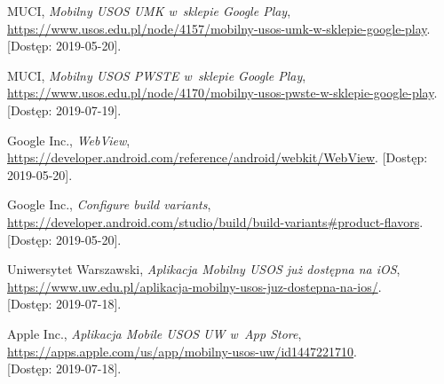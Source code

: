 \documentclass{pracamgr}
\begin{document}
\begin{thebibliography}{99}
 MUCI, \textit{Mobilny USOS UMK w~sklepie Google Play}, \url{https://www.usos.edu.pl/node/4157/mobilny-usos-umk-w-sklepie-google-play}. [Dostęp: 2019-05-20].

 MUCI, \textit{Mobilny USOS PWSTE w~sklepie Google Play}, \url{https://www.usos.edu.pl/node/4170/mobilny-usos-pwste-w-sklepie-google-play}. [Dostęp: 2019-07-19].

 Google Inc., \textit{WebView}, \url{https://developer.android.com/reference/android/webkit/WebView}. [Dostęp: 2019-05-20].

 Google Inc., \textit{Configure build variants}, \url{https://developer.android.com/studio/build/build-variants#product-flavors}. [Dostęp: 2019-05-20].

 Uniwersytet Warszawski,
\textit{Aplikacja Mobilny USOS już dostępna na iOS},\\
\url{https://www.uw.edu.pl/aplikacja-mobilny-usos-juz-dostepna-na-ios/}.\\
{[Dostęp: 2019-07-18]}.

 Apple Inc.,
\textit{Aplikacja Mobile USOS UW w~App Store},\\
\url{https://apps.apple.com/us/app/mobilny-usos-uw/id1447221710}.\\
{[Dostęp: 2019-07-18]}.

\end{thebibliography}
\end{document}
